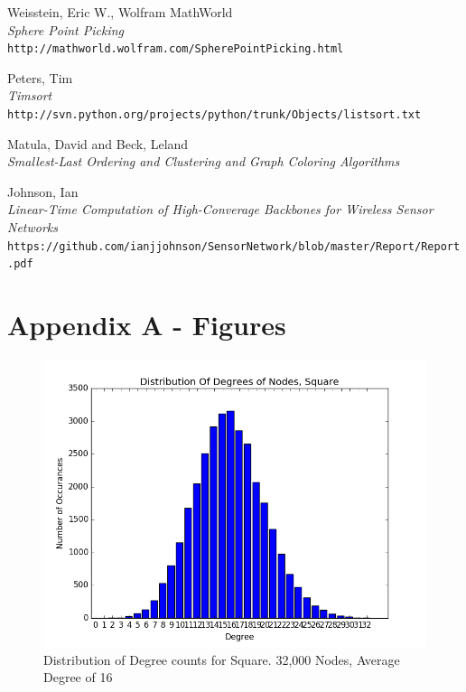 \documentclass{article}
\begin{document}
\begin{thebibliography}{10}
    Weisstein, Eric W., Wolfram MathWorld \\
    \textit{Sphere Point Picking} \\
    \texttt{http://mathworld.wolfram.com/SpherePointPicking.html}

    Peters, Tim \\
    \textit{Timsort} \\
    \texttt{http://svn.python.org/projects/python/trunk/Objects/listsort.txt}

    Matula, David and Beck, Leland \\
    \textit{Smallest-Last Ordering and Clustering and Graph Coloring Algorithms}

    Johnson, Ian \\
    \textit{Linear-Time Computation of High-Converage Backbones for Wireless Sensor Networks} \\
    \texttt{https://github.com/ianjjohnson/SensorNetwork/blob/master/Report/Report.pdf}

\end{thebibliography}

\newpage

\section{Appendix A - Figures}

\begin{figure}[h]
    \centering
        \includegraphics[scale=0.6]{./graphs/hist_deg_square.png}
        \caption{Distribution of Degree counts for Square. 32,000 Nodes, Average Degree of 16}
        \label{squaredeghist}
\end{figure}
\end{document}

